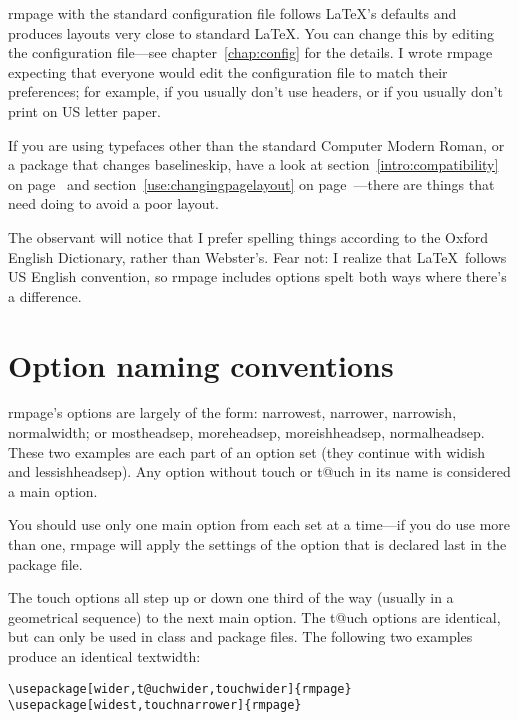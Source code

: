 \documentclass[11pt,loose,twoside,touchwider,longish,
                      noheaders,a4paper,notstdmargins]{report}
\DeclareRobustCommand*{\comname}[1]{{\ttfamily\makeatletter\bs #1\makeatother}}
\newcommand*{\classname}[1]{{\ttfamily #1}}
\newcommand*{\optname}[1]{{\ttfamily #1}}
\newcommand*{\rmpage}{\classname{rmpage}\xspace}
\begin{document}
\rmpage with the standard configuration file follows \LaTeX's defaults
and produces layouts very close to standard \LaTeX. You can change
this by editing the configuration file---see chapter~\ref{chap:config}
for the details.  I wrote \rmpage expecting that everyone would edit
the configuration file to match their preferences; for example, if you
usually don't use headers, or if you usually don't print on US letter
paper.

If you are using typefaces other than the standard Computer Modern
Roman, or a package that changes \comname{baselineskip}, have a look
at section~\ref{intro:compatibility} on
page~\pageref{intro:compatibility} and
section~\ref{use:changingpagelayout} on
page~\pageref{use:changingpagelayout}---there are things that need
doing to avoid a poor layout.

The observant will notice that I prefer spelling things according to
the Oxford English Dictionary, rather than Webster's.  Fear not: I
realize that \LaTeX\ follows US English convention, so \rmpage
includes options spelt both ways where there's a difference.

\section{Option naming conventions}

\rmpage's options are largely of the form: \optname{narrowest},
\optname{narrower}, \optname{narrowish}, \optname{normalwidth}; or
\optname{mostheadsep}, \optname{moreheadsep},
\optname{moreishheadsep}, \optname{normalheadsep}.  These two examples
are each part of an option set (they continue with \optname{widish}
and \optname{lessishheadsep}).  Any option without \optname{touch} or
\optname{t@uch} in its name is considered a main option.

You should use only one main option from each set at a time---if you
do use more than one, \rmpage will apply the settings of the option
that is declared last in the package file.

The \optname{touch} options all step up or down one third of the way
(usually in a geometrical sequence) to the next main option.  The
\optname{t@uch} options are identical, but can only be used in class
and package files.  The following two examples produce an identical
\comname{textwidth}:
\begin{verbatim}
\usepackage[wider,t@uchwider,touchwider]{rmpage}
\usepackage[widest,touchnarrower]{rmpage}
\end{verbatim}
\end{document}
